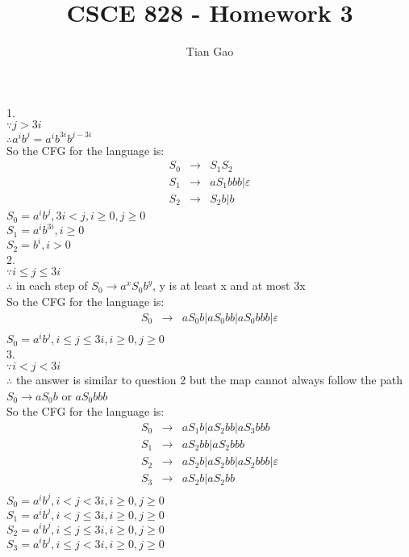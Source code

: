 \documentclass[a4paper]{article}
\title{CSCE 828 - Homework 3}
\author{Tian Gao}
\begin{document}
\maketitle

1. \\
$\because j > 3i$\\
$\therefore a^ib^j = a^ib^{3i}b^{j-3i}$\\
So the CFG for the language is:\\
$$
\begin{array}{rcr}
S_0&\rightarrow&S_1S_2\\
S_1&\rightarrow&aS_1bbb|\varepsilon\\
S_2&\rightarrow&S_2b|b
\end{array}
$$
$S_0 = a^ib^j, 3i < j, i\geqslant0,j\geqslant0$\\
$S_1 = a^ib^{3i}, i\geqslant0$\\
$S_2 = b^i,i > 0$\\

2.\\
$\because i\leqslant j \leqslant 3i$\\
$\therefore$ in each step of $S_0 \rightarrow a^xS_0b^y$, y is at least x and at most 3x\\
So the CFG for the language is:\\
$$
\begin{array}{rcr}
S_0&\rightarrow&aS_0b|aS_0bb|aS_0bbb|\varepsilon\\
\end{array}
$$
$S_0 = a^ib^j, i\leqslant j \leqslant 3i, i\geqslant0,j\geqslant0$\\

3.\\
$\because i < j < 3i$\\
$\therefore$ the answer is similar to question 2 but the map cannot always follow the path $S_0 \rightarrow aS_0b$ or $aS_0bbb$\\
So the CFG for the language is:\\
$$
\begin{array}{lcl}
S_0&\rightarrow&aS_1b|aS_2bb|aS_3bbb\\
S_1&\rightarrow&aS_2bb|aS_2bbb\\
S_2&\rightarrow&aS_2b|aS_2bb|aS_2bbb|\varepsilon\\
S_3&\rightarrow&aS_2b|aS_2bb\\
\end{array}
$$
$S_0 = a^ib^j, i < j < 3i, i\geqslant0,j\geqslant0$\\
$S_1 = a^ib^j, i < j \leqslant 3i, i\geqslant0,j\geqslant0$\\
$S_2 = a^ib^j, i\leqslant j \leqslant 3i, i\geqslant0,j\geqslant0$\\
$S_3 = a^ib^j, i\leqslant j < 3i, i\geqslant0,j\geqslant0$\\
\end{document}
